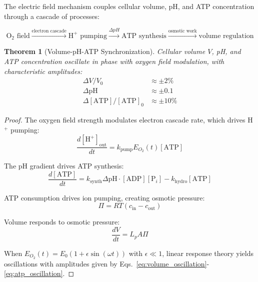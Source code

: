 \documentclass[11pt,twocolumn,a4paper]{article}
\newtheorem{theorem}{Theorem}[section]
\theoremstyle{definition}
\theoremstyle{remark}
\begin{document}
The electric field mechanism couples cellular volume, pH, and ATP concentration through a cascade of processes:

\begin{equation}
\text{O}_2 \text{ field} \xrightarrow{\text{electron cascade}} \text{H}^+ \text{ pumping} \xrightarrow{\Delta pH} \text{ATP synthesis} \xrightarrow{\text{osmotic work}} \text{volume regulation}
\label{eq:coupling_cascade}
\end{equation}

\begin{theorem}[Volume-pH-ATP Synchronization]
\label{thm:volume_ph_atp_sync}
Cellular volume $V$, pH, and ATP concentration oscillate in phase with oxygen field modulation, with characteristic amplitudes:
\begin{align}
\Delta V/V_0 &\approx \pm 2\% \label{eq:volume_oscillation} \\
\Delta \mathrm{pH} &\approx \pm 0.1 \label{eq:ph_oscillation} \\
\Delta[\mathrm{ATP}]/[\mathrm{ATP}]_0 &\approx \pm 10\% \label{eq:atp_oscillation}
\end{align}
\end{theorem}

\begin{proof}
The oxygen field strength modulates electron cascade rate, which drives H$^+$ pumping:
\begin{equation}
\frac{d[\mathrm{H}^+]_{\mathrm{out}}}{dt} = k_{\mathrm{pump}} E_{O_2}(t) [\mathrm{ATP}]
\label{eq:proton_pumping}
\end{equation}

The pH gradient drives ATP synthesis:
\begin{equation}
\frac{d[\mathrm{ATP}]}{dt} = k_{\mathrm{synth}} \Delta\mathrm{pH} \cdot [\mathrm{ADP}][\mathrm{P}_i] - k_{\mathrm{hydro}} [\mathrm{ATP}]
\label{eq:atp_synthesis}
\end{equation}

ATP consumption drives ion pumping, creating osmotic pressure:
\begin{equation}
\Pi = RT(c_{\mathrm{in}} - c_{\mathrm{out}})
\label{eq:osmotic_pressure}
\end{equation}

Volume responds to osmotic pressure:
\begin{equation}
\frac{dV}{dt} = L_p A \Pi
\label{eq:volume_dynamics}
\end{equation}

When $E_{O_2}(t) = E_0(1 + \epsilon \sin(\omega t))$ with $\epsilon \ll 1$, linear response theory yields oscillations with amplitudes given by Eqs.~\eqref{eq:volume_oscillation}-\eqref{eq:atp_oscillation}.
\end{proof}
\end{document}
